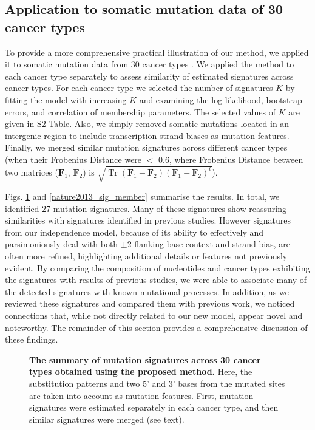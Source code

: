 \documentclass[10pt,letterpaper]{article}
\DeclareMathOperator{\Tr}{Tr}
\begin{document}
\subsection*{Application to somatic mutation data of 30 cancer types}
 
To provide a more comprehensive practical illustration of
our method, we applied it to somatic mutation data from 30 cancer types \cite{pmid23945592}.
We applied the method to each cancer type separately to assess similarity of estimated signatures across cancer types.
For each cancer type we selected the number of signatures $K$ by fitting the model with increasing $K$ and examining the log-likelihood, bootstrap errors, and correlation of membership parameters.
The selected values of $K$ are given in S2 Table.
Also, we simply removed somatic mutations located in an intergenic region to include transcription strand biases as mutation features.
Finally, we merged similar mutation signatures across different cancer types 
(when their Frobenius Distance were $<$ $0.6$, where Frobenius Distance between two matrices ($\bm{F}_1$, $\bm{F}_2$) is $\sqrt{ \Tr  (\bm{F}_1 -  \bm{F}_2 )  (\bm{F}_1 -  \bm{F}_2 )^t }$).



Figs. \ref{nature2013_sig_summary} and \ref{nature2013_sig_member} summarise the results.
In total, we identified 27 mutation signatures.
Many of these signatures show reassuring similarities with
signatures identified in previous studies. However
signatures from our independence model, because of its ability to effectively
and parsimoniously deal with both $\pm 2$ flanking
base context and strand bias, are often more refined, highlighting additional details or features not previously evident. By comparing the composition of nucleotides and cancer types exhibiting the signatures with results of previous studies, we were able to associate many of the detected signatures with known mutational processes.
In addition, as we reviewed these signatures
and compared them with previous work, we noticed connections
that, while not directly related to our new model, appear
novel and noteworthy. The remainder of this section
provides a comprehensive discussion of these findings.

\begin{figure}[h]
\centering
\caption{{\bf The summary of mutation signatures across 30 cancer types \cite{pmid23945592} obtained using the proposed method.}
Here, the substitution patterns and two 5' and 3' bases from the mutated sites are taken into account as mutation features.
First, mutation signatures were estimated separately in each cancer type, and then similar signatures were merged (see text).
}
\label{nature2013_sig_summary}
\end{figure}
\end{document}
